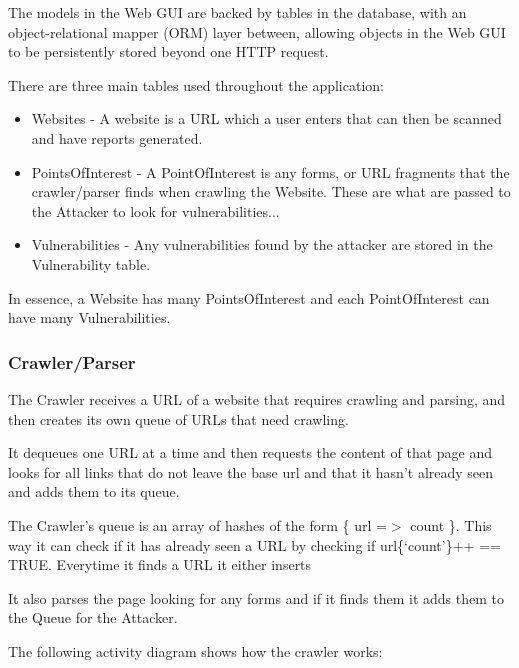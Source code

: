 \documentclass[12pt,a4paper]{article}
\begin{document}
The models in the Web GUI are backed by tables in the database, with an object-relational mapper (ORM) layer between, allowing objects in the Web GUI to be persistently stored beyond one HTTP request.

There are three main tables used throughout the application:

\begin{itemize}
    \item{Websites - A website is a URL which a user enters that can then be scanned and have reports generated.}
    \item{PointsOfInterest - A PointOfInterest is any forms, or URL fragments that the crawler/parser finds when crawling the Website.  These are what are passed to the Attacker to look for vulnerabilities...}
    \item{Vulnerabilities - Any vulnerabilities found by the attacker are stored in the Vulnerability table.}
\end{itemize}

In essence, a Website has many PointsOfInterest and each PointOfInterest can have many Vulnerabilities.

\subsubsection{Crawler/Parser}
The Crawler receives a URL of a website that requires crawling and parsing, and then creates its own queue of URLs that need crawling.  

It dequeues one URL at a time and then requests the content of that page and looks for all links that do not leave the base url and that it hasn't already seen and adds them to its queue.

The Crawler’s queue is an array of hashes of the form \{ url =$>$ count \}.  This way it can check if it has already seen a URL by checking if url\{`count'\}++ == TRUE.  Everytime it finds a URL it either inserts 

It also parses the page looking for any forms and if it finds them it adds them to the Queue for the Attacker.

The following activity diagram shows how the crawler works:
\end{document}
